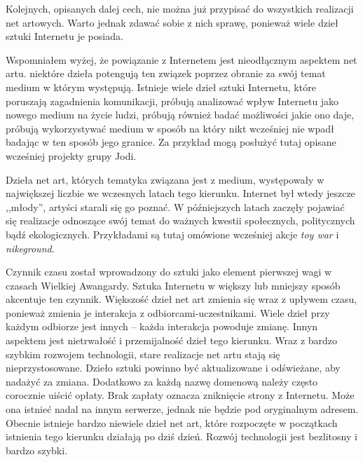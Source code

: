 \documentclass[a4paper,12pt,twoside]{article}
\begin{document}
Kolejnych, opisanych dalej cech, nie można już przypisać do wszystkich
realizacji net artowych. Warto jednak zdawać sobie z nich sprawę, ponieważ
wiele dzieł sztuki Internetu je posiada.

Wspomniałem wyżej, że powiązanie z Internetem jest nieodłącznym aspektem
net artu. niektóre dzieła potengują ten związek poprzez obranie za
swój temat medium w którym występują. Istnieje wiele dzieł sztuki
Internetu, które poruszają zagadnienia komunikacji, próbują analizować
wpływ Internetu jako nowego medium na życie ludzi, próbują również
badać możliwości jakie ono daje, próbują wykorzystywać medium w sposób
na który nikt wcześniej nie wpadł badając w ten sposób jego granice.
Za przykład mogą posłużyć tutaj opisane wcześniej projekty grupy Jodi.

Dzieła net art, których tematyka związana jest z medium, występowały
w największej liczbie we wczesnych latach tego kierunku. Internet
był wtedy jeszcze ,,młody'', artyści starali się go poznać. W późniejszych
latach zaczęły pojawiać się realizacje odnoszące swój temat do ważnych
kwestii społecznych, politycznych bądź ekologicznych. Przykładami są tutaj
omówione wcześniej akcje \textit{toy war} i \textit{nikeground}.

Czynnik czasu został wprowadzony do sztuki jako element pierwszej
wagi w czasach Wielkiej Awangardy. Sztuka Internetu w większy lub mniejszy
sposób akcentuje ten czynnik. Większość dzieł net art zmienia się 
wraz z upływem czasu, ponieważ zmienia je interakcja z odbiorcami-uczestnikami.
Wiele dzieł przy każdym odbiorze jest innych -- każda interakcja powoduje
zmianę.
Innyn aspektem jest nietrwałość i przemijalność dzieł tego kierunku.
Wraz z bardzo szybkim rozwojem technologii, stare realizacje net artu
stają się nieprzystosowane. Dzieło sztuki powinno być aktualizowane
i odświeżane, aby nadażyć za zmiana. Dodatkowo za każdą nazwę domenową
należy często corocznie uiścić opłaty. Brak zapłaty oznacza zniknięcie
strony z Internetu. Może ona istnieć nadal na innym serwerze, jednak nie
będzie pod oryginalnym adresem. Obecnie istnieje bardzo niewiele dzieł
net art, które rozpoczęte w początkach istnienia tego kierunku działają
po dziś dzień. Rozwój technologii jest bezlitosny i bardzo szybki.
\end{document}
